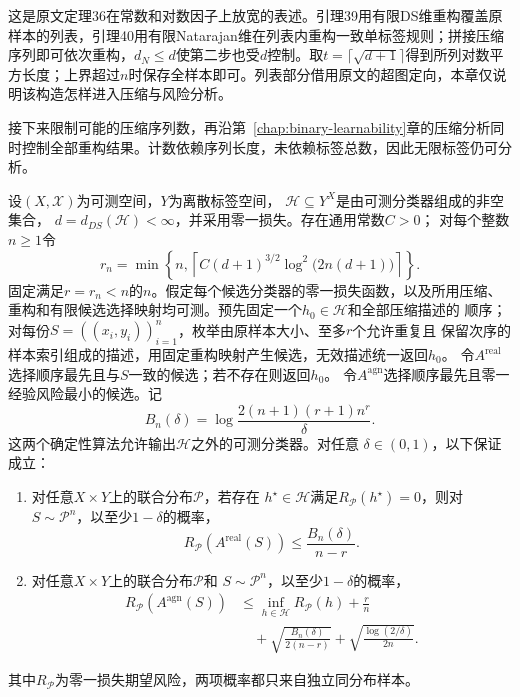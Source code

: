 这是原文定理36在常数和对数因子上放宽的表述。引理39用有限DS维重构覆盖原样本的列表，引理40用有限Natarajan维在列表内重构一致单标签规则；拼接压缩序列即可依次重构，$d_N\leq d$使第二步也受$d$控制。取$t=\lceil\sqrt{d+1}\rceil$得到所列对数平方长度；上界超过$n$时保存全样本即可。列表部分借用原文的超图定向，本章仅说明该构造怎样进入压缩与风险分析。

接下来限制可能的压缩序列数，再沿第~\ref{chap:binary-learnability}章的压缩分析同时控制全部重构结果。计数依赖序列长度，未依赖标签总数，因此无限标签仍可分析。

\begin{theorem}[有限DS维的期望风险保证]
\label{thm:finite-ds-learning-rates}
设$(X,\mathcal X)$为可测空间，$Y$为离散标签空间，
$\mathcal H\subseteq Y^X$是由可测分类器组成的非空集合，
$d=d_{DS}(\mathcal H)<\infty$，并采用零一损失。存在通用常数$C>0$；
对每个整数$n\geq1$令
\[
 r_n=\min\!\left\{n,\left\lceil
 C(d+1)^{3/2}\log^2\!\bigl(2n(d+1)\bigr)\right\rceil\right\}.
\]
固定满足$r=r_n<n$的$n$。假定每个候选分类器的零一损失函数，以及所用压缩、
重构和有限候选选择映射均可测。预先固定一个$h_0\in\mathcal H$和全部压缩描述的
顺序；对每份$S=((x_i,y_i))_{i=1}^n$，枚举由原样本大小、至多$r$个允许重复且
保留次序的样本索引组成的描述，用固定重构映射产生候选，无效描述统一返回$h_0$。
令$A^{\mathrm{real}}$选择顺序最先且与$S$一致的候选；若不存在则返回$h_0$。
令$A^{\mathrm{agn}}$选择顺序最先且零一经验风险最小的候选。记
\[
 B_n(\delta)=\log\frac{2(n+1)(r+1)n^r}{\delta}.
\]
这两个确定性算法允许输出$\mathcal H$之外的可测分类器。对任意
$\delta\in(0,1)$，以下保证成立：
\begin{enumerate}
\item 对任意$X\times Y$上的联合分布$\mathcal P$，若存在
$h^\star\in\mathcal H$满足$R_{\mathcal P}(h^\star)=0$，则对
$S\sim\mathcal P^n$，以至少$1-\delta$的概率，
 \[
 R_{\mathcal P}(A^{\mathrm{real}}(S))
 \leq\frac{B_n(\delta)}{n-r}.
 \]
\item 对任意$X\times Y$上的联合分布$\mathcal P$和
$S\sim\mathcal P^n$，以至少$1-\delta$的概率，
 \begin{align*}
 R_{\mathcal P}(A^{\mathrm{agn}}(S))
 &\leq\inf_{h\in\mathcal H}R_{\mathcal P}(h)+\frac rn\\
 &\quad+\sqrt{\frac{B_n(\delta)}{2(n-r)}}
       +\sqrt{\frac{\log(2/\delta)}{2n}}.
 \end{align*}
\end{enumerate}
其中$R_{\mathcal P}$为零一损失期望风险，两项概率都只来自独立同分布样本。
\end{theorem}

